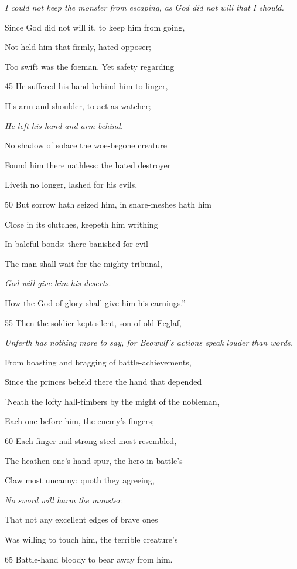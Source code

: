 \emph{I could not keep
the monster from
escaping, as God
did not will that I
should.}

Since God did not will it, to keep him from going,

Not held him that firmly, hated opposer;

Too swift was the foeman. Yet safety regarding

45
He suffered his hand behind him to linger,

His arm and shoulder, to act as watcher;

\emph{He left his hand
and arm behind.}

No shadow of solace the woe-begone creature

Found him there nathless: the hated destroyer

Liveth no longer, lashed for his evils,

50
But sorrow hath seized him, in snare-meshes hath him

Close in its clutches, keepeth him writhing

In baleful bonds: there banished for evil

The man shall wait for the mighty tribunal,

\emph{God will give him
his deserts.}

How the God of glory shall give him his earnings.”

55
Then the soldier kept silent, son of old Ecglaf,

\emph{Unferth has nothing
more to say,
for Beowulf’s actions
speak louder
than words.}

From boasting and bragging of battle-achievements,

Since the princes beheld there the hand that depended

’Neath the lofty hall-timbers by the might of the nobleman,

Each one before him, the enemy’s fingers;

60
Each finger-nail strong steel most resembled,

The heathen one’s hand-spur, the hero-in-battle’s

Claw most uncanny; quoth they agreeing,

\emph{No sword will
harm the monster.}

That not any excellent edges of brave ones

Was willing to touch him, the terrible creature’s

65
Battle-hand bloody to bear away from him.

